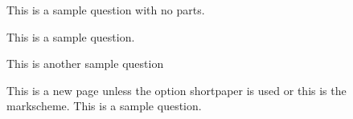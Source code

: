 \documentclass[
    style=OCRALevel,
    ]{examx}
\begin{document}
\examcover
\begin{questionpaper}
\begin{questions}
    \question[5][4] This is a sample question with no parts.
    
    
    \question This is a sample question.
    
    
    \question[2] This is another sample question
    

    \examnewpage
    This is a new page unless the option shortpaper is used or this is 
    the markscheme.
    \question This is a sample question.
    
\end{questions}
\end{questionpaper}
\end{document}
